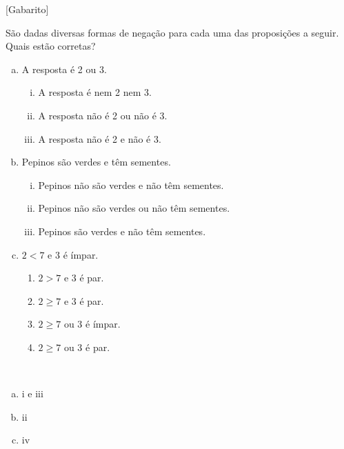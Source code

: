 \documentclass[a4paper, 12pt, addpoints]{exam}
\begin{document}
\info\vspace{-1 cm} %
[Gabarito]
\begin{questions}%
  \question São dadas diversas formas de negação para cada uma das proposições a seguir.
  Quais estão corretas?

  \begin{enumerate}[a)]
    \item  A resposta é 2 ou 3.
          \begin{enumerate}[i.]
            \item A resposta é nem 2 nem 3.
            \item A resposta não é 2 ou não é 3.
            \item A resposta não é 2 e não é 3.
          \end{enumerate}
    \item Pepinos são verdes e têm sementes.
          \begin{enumerate}[i.]
            \item Pepinos não são verdes e não têm sementes.
            \item Pepinos não são verdes ou não têm sementes.
            \item Pepinos são verdes e não têm sementes.
          \end{enumerate}
    \item $ 2 < 7 $ e $3$ é ímpar.
          \begin{enumerate}
            \item $2 > 7$ e 3 é par.
            \item $2 \geq 7$ e 3 é par.
            \item $2 \geq  7$ ou 3 é ímpar.
            \item $2 \geq  7$ ou 3 é par.
          \end{enumerate}
  \end{enumerate}

  \begin{resp}~
    \begin{multicols}{4}
          \begin{enumerate}[a)]
            \item i e iii
            \item ii
            \item iv
          \end{enumerate}
        \end{multicols}
  \end{resp}


\end{questions}
\end{document}
